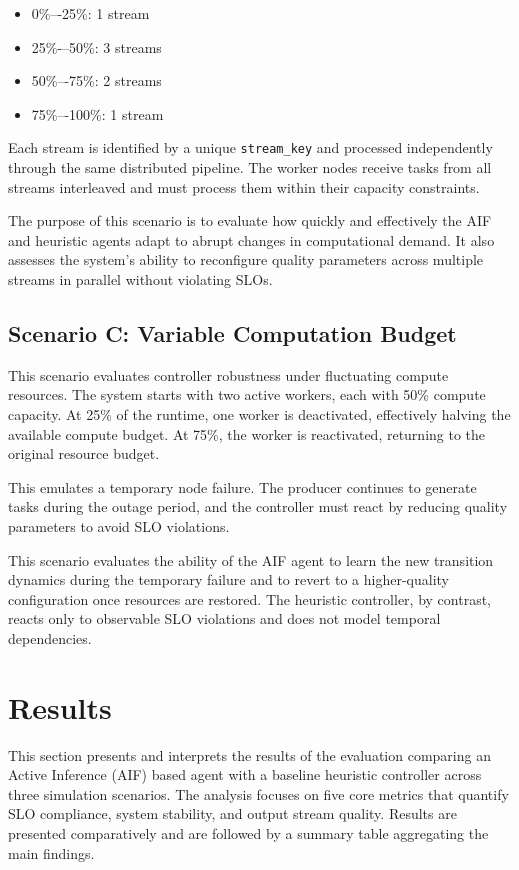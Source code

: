 \begin{itemize}
    \item 0\%–-25\%: 1 stream
    \item 25\%-–50\%: 3 streams
    \item 50\%–-75\%: 2 streams
    \item 75\%–-100\%: 1 stream
\end{itemize}

Each stream is identified by a unique \texttt{stream\_key} and processed independently through the same distributed pipeline. The worker nodes receive tasks from all streams interleaved and must process them within their capacity constraints.

The purpose of this scenario is to evaluate how quickly and effectively the AIF and heuristic agents adapt to abrupt changes in computational demand. It also assesses the system’s ability to reconfigure quality parameters across multiple streams in parallel without violating SLOs.

\subsection{Scenario C: Variable Computation Budget}
\label{sec:evaluation-variable-budget}

This scenario evaluates controller robustness under fluctuating compute resources. The system starts with two active workers, each with 50\% compute capacity. At 25\% of the runtime, one worker is deactivated, effectively halving the available compute budget. At 75\%, the worker is reactivated, returning to the original resource budget.

This emulates a temporary node failure. The producer continues to generate tasks during the outage period, and the controller must react by reducing quality parameters to avoid SLO violations.

This scenario evaluates the ability of the AIF agent to learn the new transition dynamics during the temporary failure and to revert to a higher-quality configuration once resources are restored. The heuristic controller, by contrast, reacts only to observable SLO violations and does not model temporal dependencies.

\section{Results}

This section presents and interprets the results of the evaluation comparing an Active Inference (AIF) based agent with a baseline heuristic controller across three simulation scenarios. The analysis focuses on five core metrics that quantify SLO compliance, system stability, and output stream quality. Results are presented comparatively and are followed by a summary table aggregating the main findings.

